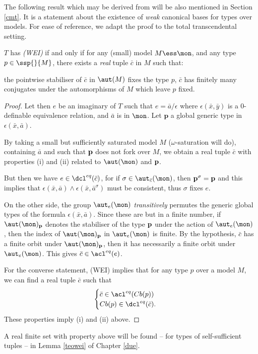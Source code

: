 The following result which may be derived from \cite[Proposition 2.5]{cafa} will be also mentioned in Section \ref{cmt}. It is a statement
about the existence of {\em weak} canonical bases for types over models.
For ease of reference, we adapt the proof to the total transcendental setting.
\begin{lem}\label{weimodels}
$T$ has {\em (WEI)} if and only if for any (small) model $M\ess\mon$, and any type $p\in\ssp{}{M}$, there exists a {\em real} tuple $\bar c$
in $M$ such that:
\begin{itemize}
the pointwise stabiliser of $\bar c$ in $\aut(M)$ fixes the type $p$,
$\bar c$ has finitely many conjugates under the automorphisms of $M$ which leave $p$ fixed.
\end{itemize}
\end{lem}
\begin{proof}
Let then $e$ be an imaginary of $T$ such that $e=\bar a/\epsilon$ where $\epsilon(\bar x,\bar y)$ is a $0$-definable
equivalence relation, and $\bar a$ is in $\mon$. Let $\mathbf{p}$ a global generic type in $\epsilon(\bar x,\bar a)$.

By taking a small but sufficiently saturated model $M$ ($\omega$-saturation will do), containing $\bar a$ and such that ${\bf p}$ does not
fork over $M$, we obtain a real tuple $\bar c$ with properties (i) and (ii) related to $\aut(\mon)$ and ${\bf p}$.

But then we have $e\in\dcl^{eq}(\bar c)$, for if $\sigma\in\aut_{\bar c}(\mon)$, then ${\bf p}^{\sigma}={\bf p}$ and
this implies that $\epsilon(\bar x,\bar a)\wedge\epsilon(\bar x,\bar a^{\sigma})$ must be consistent, thus $\sigma$ fixes $e$.

On the other side, the group $\aut_{e}(\mon)$ {\em transitively} permutes the generic global types of the formula
$\epsilon(\bar x,\bar a)$. Since these are but in a finite number,
if $\aut(\mon)_{\bf p}$ denotes the stabiliser of the type ${\bf p}$ under the action of $\aut_{e}(\mon)$,
then the index of $\aut(\mon)_{\bf p}$ in $\aut_{e}(\mon)$ is finite. By the hypothesis, $\bar c$ has a finite orbit under $\aut(\mon)_{\bf p}$, then it has
necessarily a finite orbit under $\aut_{e}(\mon)$. This gives $\bar c\in\acl^{eq}(e)$.

\smallskip
For the converse statement, (WEI) implies that for any type $p$ over a model $M$, we can find a real tuple $\bar c$ such that
\begin{gather}
\begin{cases}\label{ciBi}
\bar c\in\acl^{eq}(Cb(p))\\Cb(p)\in\dcl^{eq}(\bar c).
\end{cases}
\end{gather}
These properties imply (i) and (ii) above.
\end{proof}
A real finite set with property  above will be found -- for types of self-sufficient tuples -- in Lemma \ref{teowei} of
Chapter \ref{due}.

